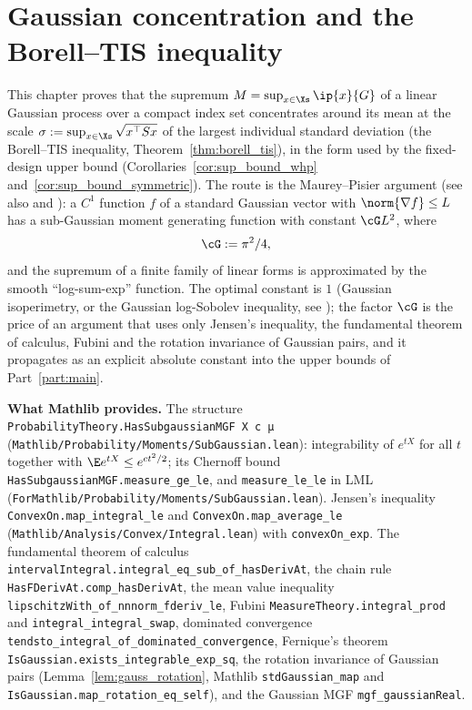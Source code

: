 \chapter{Gaussian concentration and the Borell--TIS inequality}
\label{chap:pre_concentration}

This chapter proves that the supremum $M = \sup_{x\in\Xs}\ip{x}{G}$ of a linear Gaussian
process over a compact index set concentrates around its mean at the scale
$\sigma := \sup_{x\in\Xs}\sqrt{x^\top S x}$ of the largest individual standard deviation
(the Borell--TIS inequality, Theorem~\ref{thm:borell_tis}), in the form used by the
fixed-design upper bound (Corollaries~\ref{cor:sup_bound_whp}
and~\ref{cor:sup_bound_symmetric}). The route is the Maurey--Pisier argument
\cite{pisier1986probabilistic} (see also \cite[Section~5.4]{vershynin2018high} and
\cite[Chapter~5]{boucheron2013concentration}): a $C^1$ function $f$ of a standard Gaussian
vector with $\norm{\nabla f} \le L$ has a sub-Gaussian moment generating function with
constant $\cG L^2$, where
\[
  \cG := \pi^2/4 ,
\]
and the supremum of a finite family of linear forms is approximated by the smooth
``log-sum-exp'' function. The optimal constant is $1$ (Gaussian isoperimetry, or the
Gaussian log-Sobolev inequality, see \cite{adler2007random}); the factor $\cG$ is the price
of an argument that uses only Jensen's inequality, the fundamental theorem of calculus, Fubini
and the rotation invariance of Gaussian pairs, and it propagates as an explicit absolute
constant into the upper bounds of Part~\ref{part:main}.

\textbf{What Mathlib provides.} The structure \texttt{ProbabilityTheory.HasSubgaussianMGF X c μ}
(\texttt{Mathlib/Probability/Moments/SubGaussian.lean}): integrability of $e^{tX}$ for all
$t$ together with $\E e^{tX} \le e^{ct^2/2}$; its Chernoff bound
\texttt{HasSubgaussianMGF.measure\_ge\_le}, and \texttt{measure\_le\_le} in LML
(\texttt{ForMathlib/Probability/Moments/SubGaussian.lean}). Jensen's inequality
\texttt{ConvexOn.map\_integral\_le} and \texttt{ConvexOn.map\_average\_le}
(\texttt{Mathlib/Analysis/Convex/Integral.lean}) with \texttt{convexOn\_exp}. The fundamental
theorem of calculus \texttt{intervalIntegral.integral\_eq\_sub\_of\_hasDerivAt}, the chain
rule \texttt{HasFDerivAt.comp\_hasDerivAt}, the mean value inequality
\texttt{lipschitzWith\_of\_nnnorm\_fderiv\_le}, Fubini \texttt{MeasureTheory.integral\_prod}
and \texttt{integral\_integral\_swap}, dominated convergence
\texttt{tendsto\_integral\_of\_dominated\_convergence}, Fernique's theorem
\texttt{IsGaussian.exists\_integrable\_exp\_sq}, the rotation invariance of Gaussian pairs
(Lemma~\ref{lem:gauss_rotation}, Mathlib \texttt{stdGaussian\_map} and
\texttt{IsGaussian.map\_rotation\_eq\_self}), and the Gaussian MGF \texttt{mgf\_gaussianReal}.

